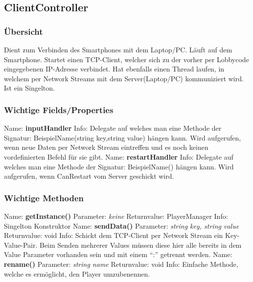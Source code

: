 \subsection{ClientController}
\subsubsection{Übersicht}
Dient zum Verbinden des Smartphones mit dem Laptop/PC. Läuft auf dem Smartphone. Startet einen TCP-Client, welcher sich zu der vorher per Lobbycode eingegebenen IP-Adresse verbindet. Hat ebenfalls einen Thread laufen, in welchem per Network Streams mit dem Server(Laptop/PC) kommuniziert wird. Ist ein Singelton.
\subsubsection{Wichtige Fields/Properties}
Name: \textbf{inputHandler}
\newline
Info: Delegate auf welches man eine Methode der Signatur: BeispielName(string key,string value) hängen kann. Wird aufgerufen, wenn neue Daten per Network Stream eintreffen und es noch keinen vordefinierten Befehl für sie gibt.
\newline \newline
Name: \textbf{restartHandler}
\newline
Info: Delegate auf welches man eine Methode der Signatur: BeispielName() hängen kann. Wird aufgerufen, wenn CanRestart vom Server geschickt wird.
\newline
\subsubsection{Wichtige Methoden}
Name: \textbf{getInstance()}
\newline
Parameter: \textit{keine}
\newline
Returnvalue: PlayerManager
\newline
Info: Singelton Konstruktor
\newline \newline
Name: \textbf{sendData()}
\newline
Parameter: \textit{string key, string value}
\newline
Returnvalue: void
\newline
Info: Schickt dem TCP-Client per Network Stream ein Key-Value-Pair. Beim Senden mehrerer Values müssen diese hier alle bereits in dem Value Parameter vorhanden sein und mit einem “:” getrennt werden.
\newline \newline
Name: \textbf{rename()}
\newline 
Parameter: \textit{string name}
\newline
Returnvalue: void
\newline
Info: Einfache Methode, welche es ermöglicht, den Player umzubenennen.
\newline 
